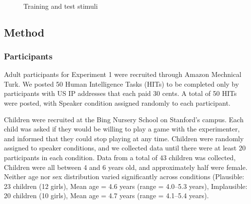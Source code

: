 \documentclass[man,floatsintext]{apa6}
\begin{document}
\begin{figure}[t]
     \begin{center}
        \\
    \end{center}
    \caption{Training and test stimuli
     }%
   \label{fig:stimuli}
\end{figure}


\subsection{Method}
\subsubsection{Participants}

Adult participants for Experiment 1 were recruited through Amazon Mechnical Turk. We posted 50 Human Intelligence Tasks (HITs) to be completed only by participants with US IP addresses that each paid 30 cents. A total of 50 HITs were posted, with Speaker condition assigned randomly to each participant.

Children were recruited at the Bing Nursery School on Stanford's campus. Each child was asked if they would be willing to play a game with the experimenter, and informed that they could stop playing at any time. Children were randomly assigned to speaker conditions, and we collected data until there were at least 20 participants in each condition. Data from a total of 43 children was collected, Children were all between 4 and 6 years old, and approximately half were female. Neither age nor sex distribution varied significantly across conditions (Plausible: 23 children (12 girls), Mean age = 4.6 years (range = 4.0--5.3 years), Implausible: 20 children (10 girls), Mean age = 4.7 years (range = 4.1--5.4 years).
\end{document}
